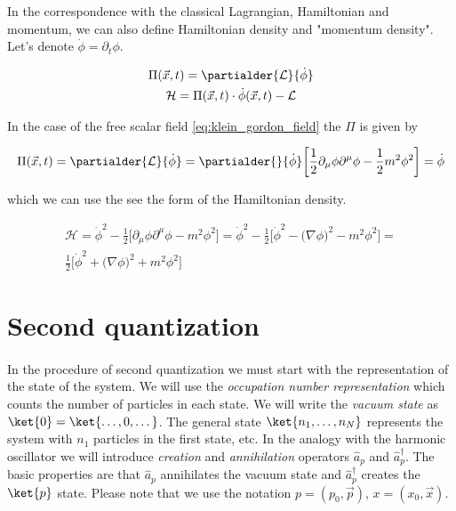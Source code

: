 In the correspondence with the classical Lagrangian, Hamiltonian and momentum, we can also define Hamiltonian density and "momentum density". Let's 
denote $\dot{\phi} = \partial_{t} \phi$. 

\begin{equation*}
    \begin{gathered}
        \Pi(\vec{x}, t) = \partialder{\mathcal{L}}{\dot{\phi}} \\
        \mathcal{H} = \Pi(\vec{x}, t) \cdot \dot{\phi}(\vec{x}, t) - \mathcal{L}
    \end{gathered}
\end{equation*}

In the case of the free scalar field \ref{eq:klein_gordon_field} the $\Pi$ is given by

\begin{equation*}
    \begin{gathered}
        \Pi(\vec{x}, t) = \partialder{\mathcal{L}}{\dot{\phi}} = \partialder{}{\dot{\phi}} \bigg[\frac{1}{2} \partial_{\mu} \phi \partial^{\mu} \phi - \frac{1}{2} m^{2} \phi^{2}\bigg]
        = \dot{\phi}
    \end{gathered}
\end{equation*}

which we can use the see the form of the Hamiltonian density.

\begin{equation*}
    \begin{gathered}
        \mathcal{H} = \dot{\phi}^{2} - \frac{1}{2}\bigg[\partial_{\mu} \phi \partial^{\mu} \phi - m^{2} \phi^{2}\bigg] = 
        \dot{\phi}^{2} - \frac{1}{2}\bigg[\dot{\phi}^{2} - \big(\nabla \phi\big)^{2} - m^{2} \phi^{2}\bigg] = \\
        \frac{1}{2}\bigg[\dot{\phi}^{2} + \big(\nabla \phi\big)^{2} + m^{2} \phi^{2}\bigg]
    \end{gathered}
\end{equation*}

\section{Second quantization}

\paragraph{} In the procedure of second quantization we must start with the representation of the state of the system. We
will use the \textit{occupation number representation} which counts the number of particles in each state. We
will write the \textit{vacuum state} as $\ket{0} = \ket{\dots, 0, \dots}$. The general state $\ket{n_{1}, \dots, n_{N}}$
represents the system with $n_{1}$ particles in the first state, etc. In the analogy with the harmonic oscillator we will
introduce \textit{creation} and \textit{annihilation} operators $\hat{a}_{p}$ and $\hat{a}^{\dagger}_{p}$.
The basic properties are that $\hat{a}_{p}$ annihilates the vacuum state and $\hat{a}^{\dagger}_{p}$ creates
the $\ket{p}$ state. Please note that we use the notation $p = (p_{0}, \vec{p})$, $x = (x_{0}, \vec{x})$.

